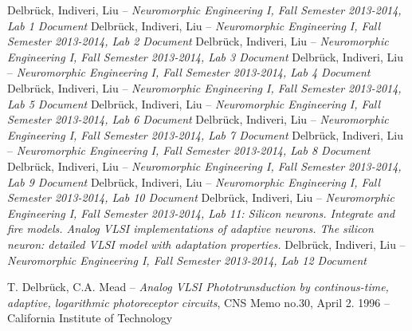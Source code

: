 \documentclass[main]{subfiles}
\begin{document}
\begin{thebibliography}{7}
Delbrück, Indiveri, Liu -- \emph{Neuromorphic Engineering I, Fall Semester 2013-2014, Lab 1 Document}
Delbrück, Indiveri, Liu -- \emph{Neuromorphic Engineering I, Fall Semester 2013-2014, Lab 2 Document}
Delbrück, Indiveri, Liu -- \emph{Neuromorphic Engineering I, Fall Semester 2013-2014, Lab 3 Document}
Delbrück, Indiveri, Liu -- \emph{Neuromorphic Engineering I, Fall Semester 2013-2014, Lab 4 Document}
Delbrück, Indiveri, Liu -- \emph{Neuromorphic Engineering I, Fall Semester 2013-2014, Lab 5 Document}
Delbrück, Indiveri, Liu -- \emph{Neuromorphic Engineering I, Fall Semester 2013-2014, Lab 6 Document}
Delbrück, Indiveri, Liu -- \emph{Neuromorphic Engineering I, Fall Semester 2013-2014, Lab 7 Document}
Delbrück, Indiveri, Liu -- \emph{Neuromorphic Engineering I, Fall Semester 2013-2014, Lab 8 Document}
Delbrück, Indiveri, Liu -- \emph{Neuromorphic Engineering I, Fall Semester 2013-2014, Lab 9 Document}
Delbrück, Indiveri, Liu -- \emph{Neuromorphic Engineering I, Fall Semester 2013-2014, Lab 10 Document}
Delbrück, Indiveri, Liu -- \emph{Neuromorphic Engineering I, Fall Semester 2013-2014, Lab 11: Silicon neurons. Integrate and fire models. Analog VLSI implementations of adaptive neurons. The silicon neuron: detailed VLSI model with adaptation properties. }
Delbrück, Indiveri, Liu -- \emph{Neuromorphic Engineering I, Fall Semester 2013-2014, Lab 12 Document}

T. Delbrück, C.A. Mead -- \emph{Analog VLSI Phototrunsduction by continous-time, adaptive, logarithmic photoreceptor circuits}, CNS Memo no.30, April 2. 1996 -- California Institute of Technology

\end{thebibliography}
\end{document}
